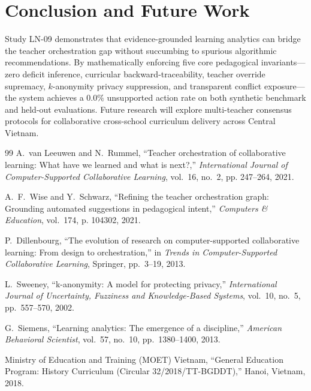 \documentclass[11pt,a4paper]{article}
\begin{document}
\section{Conclusion and Future Work}
Study LN-09 demonstrates that evidence-grounded learning analytics can bridge the teacher orchestration gap without succumbing to spurious algorithmic recommendations. By mathematically enforcing five core pedagogical invariants—zero deficit inference, curricular backward-traceability, teacher override supremacy, $k$-anonymity privacy suppression, and transparent conflict exposure—the system achieves a $0.0\%$ unsupported action rate on both synthetic benchmark and held-out evaluations. Future research will explore multi-teacher consensus protocols for collaborative cross-school curriculum delivery across Central Vietnam.


\begin{thebibliography}{99}
A.~van Leeuwen and N.~Rummel, ``Teacher orchestration of collaborative learning: What have we learned and what is next?,'' \emph{International Journal of Computer-Supported Collaborative Learning}, vol.~16, no.~2, pp. 247--264, 2021.

A.~F.~Wise and Y.~Schwarz, ``Refining the teacher orchestration graph: Grounding automated suggestions in pedagogical intent,'' \emph{Computers \& Education}, vol.~174, p. 104302, 2021.

P.~Dillenbourg, ``The evolution of research on computer-supported collaborative learning: From design to orchestration,'' in \emph{Trends in Computer-Supported Collaborative Learning}, Springer, pp.~3--19, 2013.

L.~Sweeney, ``k-anonymity: A model for protecting privacy,'' \emph{International Journal of Uncertainty, Fuzziness and Knowledge-Based Systems}, vol.~10, no.~5, pp.~557--570, 2002.

G.~Siemens, ``Learning analytics: The emergence of a discipline,'' \emph{American Behavioral Scientist}, vol.~57, no.~10, pp.~1380--1400, 2013.

Ministry of Education and Training (MOET) Vietnam, ``General Education Program: History Curriculum (Circular 32/2018/TT-BGDDT),'' Hanoi, Vietnam, 2018.
\end{thebibliography}
\end{document}
